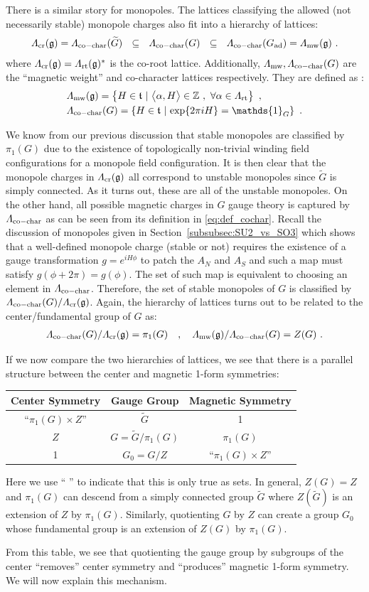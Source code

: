 \documentclass[11pt]{article}
\newcommand{\eq}[1]{\begin{align}\begin{split}#1\end{split}\end{align}}
\def\tG{{\widetilde{G}}}
\def\IZ{{\mathbb{Z}}}
\def\fg{\mathfrak{g}}
\def\ft{\mathfrak{t}}
\def\ft{\mathfrak{t}}
\begin{document}
There is a similar story for monopoles. The lattices classifying the allowed (not necessarily stable) monopole charges also fit into a hierarchy of lattices:
\eq{
\Lambda_{\rm cr}(\fg)=\Lambda_{\rm co-char}(\widetilde{G})~~\subseteq~~ \Lambda_{\rm co-char}(G)~~\subseteq~~  \Lambda_{\rm co-char}(G_{\rm ad})=\Lambda_{\rm mw}(\fg)~.
}
where $\Lambda_{\rm cr}(\fg)=\Lambda_{\rm rt}(\fg)^\ast$ is the co-root lattice. Additionally, $\Lambda_{\rm mw},\Lambda_{\rm co-char}(G)$ are  the  ``magnetic weight'' and co-character lattices respectively. They are defined as  \cite{Moore:2014jfa}:
\eq{
&\Lambda_{\rm mw}(\fg)=\left\{H\in \ft ~|~\big\langle \alpha, H\big\rangle\in \IZ~,~\forall \alpha \in \Lambda_{\rm rt}\right\}~,\\
&\Lambda_{\rm co-char}(G)=\left\{H\in \ft~|~{\rm exp}\{2\pi i H\}=\mathds{1}_G\right\}~. \label{eq:def_cochar}
}

We know from our previous discussion that stable monopoles are classified by $\pi_1(G)$ due to the existence of topologically non-trivial winding field configurations for a monopole field configuration. It is then clear that the monopole charges in $\Lambda_{\rm cr}(\fg)$ all correspond to unstable monopoles since $\tG$ is simply connected. As it turns out, these are all of the unstable monopoles. On the other hand, all possible magnetic charges in $G$ gauge theory is captured by $\Lambda_{\rm co-char}$ as can be seen from its definition in \eqref{eq:def_cochar}. Recall the discussion of monopoles given in Section~\ref{subsubsec:SU2_vs_SO3} which shows that a well-defined monopole charge (stable or not) requires the existence of a gauge transformation $g=e^{iH\phi}$ to patch the $A_N$ and $A_S$ and such a map must satisfy $g (\phi + 2\pi) = g (\phi)$. The set of such map is equivalent to choosing an element in $\Lambda_{\rm co-char}$. 
Therefore, the set of stable monopoles of $G$ is classified by $\Lambda_{\rm co-char}(G)/\Lambda_{\rm cr}(\fg)$. 
Again, the hierarchy of lattices turns out to be related to the center/fundamental group of $G$ as:
\eq{ 
\Lambda_{\rm co-char}(G)/\Lambda_{\rm cr}(\fg)=\pi_1(G)\quad, \quad\Lambda_{\rm mw}(\fg)/\Lambda_{\rm co-char}(G)=Z(G) ~. 
}


 

If we now compare the two hierarchies of lattices, we see that there is a parallel structure between the center and magnetic 1-form  symmetries:
\begin{center}\begin{tabular}{c|c|c}
Center Symmetry & Gauge Group & Magnetic Symmetry\\
\hline 
``$\pi_1(G)\times Z$'' & $\tG$ & 1\\
$Z$ & $G=\tG/\pi_1(G)$ & $\pi_1(G)$\\
1& $G_{0}=G/Z$ & ``$\pi_1(G)\times Z$''
\end{tabular}
\end{center}
Here we use `` '' to indicate that this is only true as sets. In general, $Z(G)=Z$ and $\pi_1(G)$ can descend from a simply connected group $\tG$ where $Z(\tG)$ is an extension of $Z$ by $\pi_1(G)$. Similarly, quotienting $G$ by $Z$ can create a group $G_0$ whose fundamental group is an extension  of $Z(G)$ by $\pi_1 (G)$. 

From this table, we see that quotienting the gauge group by subgroups of the center ``removes'' center symmetry and ``produces'' magnetic 1-form  symmetry. We will now explain this mechanism. 

  


\end{document}
